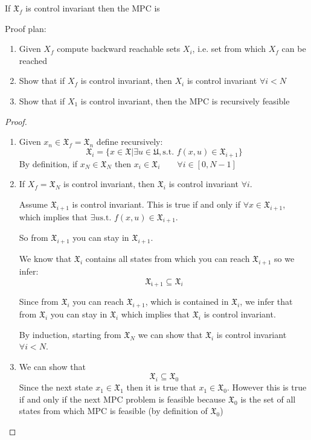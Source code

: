 \begin{theorem}
If $\mathfrak{X}_f$ is control invariant then the MPC is 
\end{theorem}

Proof plan:
\begin{enumerate}
\item Given $X_f$ compute backward reachable sets $X_i$, i.e. set from which $X_f$ can be reached
\item Show that if $X_f$ is control invariant, then $X_i$ is control invariant $\forall i < N$
\item Show that if $X_1$ is control invariant, then the MPC is recursively feasible
\end{enumerate}
\begin{proof}
\begin{enumerate}
\item Given $x_n \in \mathfrak{X}_f = \mathfrak{X}_n$ define  recursively:
\[\mathfrak{X}_i = \{x\in\mathfrak{X}|\exists u\in\mathfrak{U}, \text{s.t. } f(x,u)\in\mathfrak{X}_{i+1}\}\]
By definition, if $x_N  \in \mathfrak{X}_N$ then $x_i\in\mathfrak{X}_i\qquad\forall i \in[0,N-1]$
\item If $X_f = \mathfrak{X}_N$ is control invariant, then $\mathfrak{X}_i$ is control invariant $\forall i$.

Assume $\mathfrak{X}_{i+1}$ is control invariant. This is true if and only if $\forall x \in \mathfrak{X}_{i+1}$, which implies that $\exists u \text{s.t. } f(x,u)\in \mathfrak{X}_{i+1}$.

So from $\mathfrak{X}_{i+1}$ you can stay in $\mathfrak{X}_{i+1}$.

We know that $\mathfrak{X}_i$ contains all states from which you can reach $\mathfrak{X}_{i+1}$ so we infer:
\[\mathfrak{X_{i+1}}\subseteq \mathfrak{X}_i\]

Since from $\mathfrak{X}_i$ you can reach $\mathfrak{X}_{i+1}$, which is contained in $\mathfrak{X}_i$, we infer that from $\mathfrak{X}_i$ you can stay in $\mathfrak{X}_i$ which implies that $\mathfrak{X}_i$ is control  invariant.

By induction, starting from $\mathfrak{X}_N$ we can show that $\mathfrak{X}_i$ is control invariant $\forall i <N$.
\item We can show that 
\[\mathfrak{X}_i \subseteq \mathfrak{X}_0\]
Since the next state $x_1\in\mathfrak{X}_1$  then it is true that $x_1\in\mathfrak{X}_0$. However this is true if and only if the next MPC problem is feasible because $\mathfrak{X}_0$ is the set of all states from which MPC is feasible (by definition of $\mathfrak{X}_0$)
\end{enumerate}
\end{proof}
 
